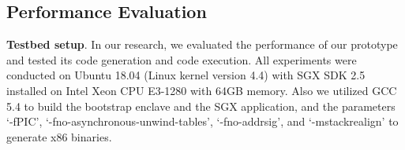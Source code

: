 





\subsection{Performance Evaluation}\label{subsec-experiments}







\noindent\textbf{Testbed setup}. 
In our research, we evaluated the performance of our prototype and tested its code generation and code execution. All experiments were conducted on Ubuntu 18.04 (Linux kernel version 4.4) with SGX SDK 2.5 installed on Intel Xeon CPU E3-1280 with 64GB memory.
Also we utilized  GCC 5.4 to build the bootstrap enclave and the SGX application, and the parameters `-fPIC', `-fno-asynchronous-unwind-tables', `-fno-addrsig', and `-mstackrealign' to generate x86 binaries. 

